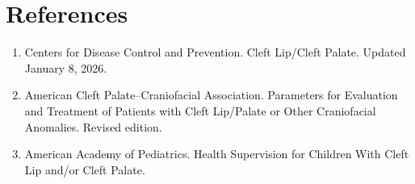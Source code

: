 \section*{References}
\begin{enumerate}
  \item Centers for Disease Control and Prevention. Cleft Lip/Cleft Palate. Updated January 8, 2026.
  \item American Cleft Palate--Craniofacial Association. Parameters for Evaluation and Treatment of Patients with Cleft Lip/Palate or Other Craniofacial Anomalies. Revised edition.
  \item American Academy of Pediatrics. Health Supervision for Children With Cleft Lip and/or Cleft Palate.
\end{enumerate}

\clearpage
